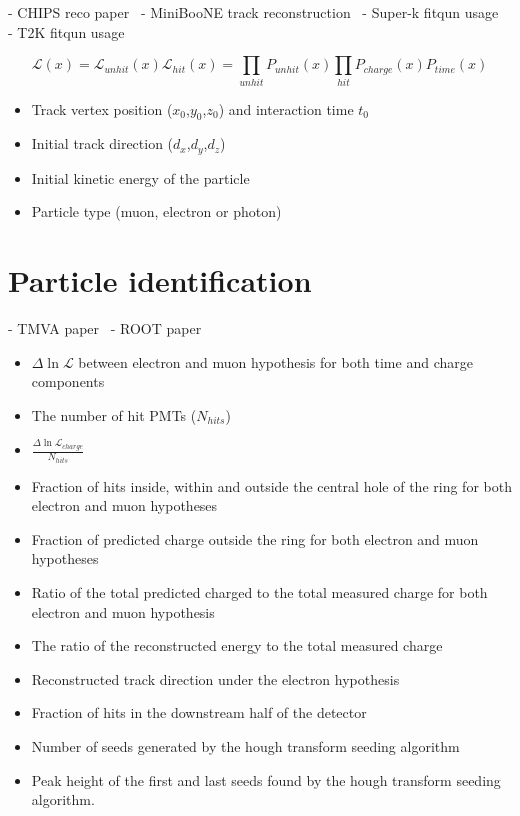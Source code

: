 - CHIPS reco paper~\cite{blake2016}
- MiniBooNE track reconstruction~\cite{patterson2009}
- Super-k fitqun usage~\cite{jiang2019}
- T2K fitqun usage~\cite{missert2017}

\begin{equation} %
    \mathcal{L}(x)=\mathcal{L}_{unhit}(x)\mathcal{L}_{hit}(x)=\prod_{unhit}P_{unhit}(x)
    \prod_{hit}P_{charge}(x)P_{time}(x)
\end{equation}

\begin{itemize}
    \item Track vertex position ($x_{0}$,$y_{0}$,$z_{0}$) and interaction time $t_{0}$
    \item Initial track direction ($d_{x}$,$d_{y}$,$d_{z}$)
    \item Initial kinetic energy of the particle
    \item Particle type (muon, electron or photon)
\end{itemize}


\section{Particle identification} %
\label{sec:cvn_old_pid} %

- TMVA paper~\cite{hocker2007}
- ROOT paper~\cite{brun1997}

\begin{itemize}
    \item $\Delta\ln\mathcal{L}$ between electron and muon hypothesis for both time and charge
          components
    \item The number of hit PMTs ($N_{hits}$)
    \item $\frac{\Delta\ln\mathcal{L}_{charge}}{N_{hits}}$
    \item Fraction of hits inside, within and outside the central hole of the ring for
          both electron and muon hypotheses
    \item Fraction of predicted charge outside the ring for both electron and muon hypotheses
    \item Ratio of the total predicted charged to the total measured charge for both electron
          and muon hypothesis
    \item The ratio of the reconstructed energy to the total measured charge
    \item Reconstructed track direction under the electron hypothesis
    \item Fraction of hits in the downstream half of the detector

    \item Number of seeds generated by the hough transform seeding algorithm
    \item Peak height of the first and last seeds found by the hough transform seeding algorithm.
\end{itemize}

